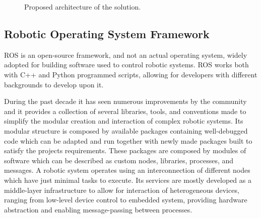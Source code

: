 {\begin{figure}[H]
\begin{center}
		\caption[Caption]{Proposed architecture of the solution. \centering}
		\label{fig:structure}
	\end{center}
\end{figure}
}

\subsection{Robotic Operating System Framework}
\label{ssec:ros}
\noindent \Gls{ROS}\cite{288} is an open-source framework, and not an actual operating system, widely adopted for building software used to control robotic systems.
\Gls{ROS} works both with C++ and Python programmed scripts, allowing for developers with different backgrounds to develop upon it.

During the past decade it has seen numerous improvements by the community and it provides a collection of several libraries, tools, and conventions made to simplify the modular creation and interaction of complex robotic systems.
Its modular structure is composed by available packages containing well-debugged code which can be adapted and run together with newly made packages built to satisfy the projects requirements.
These packages are composed by modules of software which can be described as custom nodes, libraries, processes, and messages.
A robotic system operates using an interconnection of different nodes which have just minimal tasks to execute.
Its services are mostly developed as a middle-layer infrastructure to allow for interaction of heterogeneous devices, ranging from low-level device control to embedded system, providing hardware abstraction and enabling message-passing between processes.

